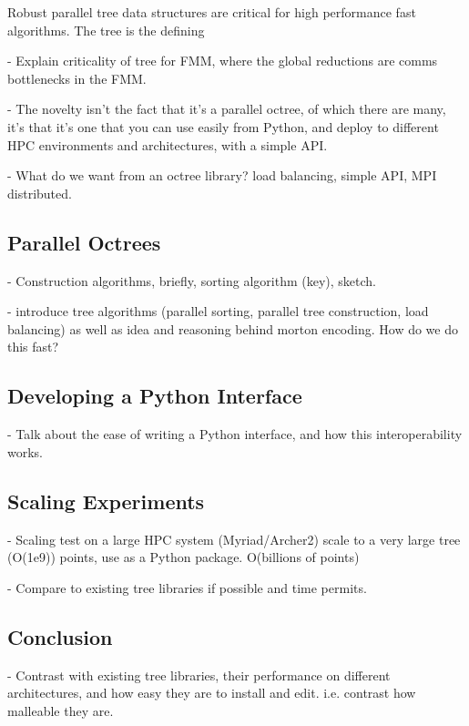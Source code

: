 Robust parallel tree data structures are critical for high performance fast algorithms. The tree is the defining 

- Explain criticality of tree for FMM, where the global reductions are comms bottlenecks in the FMM.

- The novelty isn't the fact that it's a parallel octree, of which there are many, it's that it's one that you can use easily from Python, and deploy to different HPC environments and architectures, with a simple API.

- What do we want from an octree library? load balancing, simple API, MPI distributed.

\subsection*{Parallel Octrees}

- Construction algorithms, briefly, sorting algorithm (key), sketch.

- introduce tree algorithms (parallel sorting, parallel tree construction, load balancing) as well as idea and reasoning behind morton encoding. How do we do this fast? 

\subsection*{Developing a Python Interface}
- Talk about the ease of writing a Python interface, and how this interoperability works.

\subsection*{Scaling Experiments}

- Scaling test on a large HPC system (Myriad/Archer2) scale to a very large tree (O(1e9)) points, use as a Python package.  O(billions of points)

- Compare to existing tree libraries if possible and time permits.

\subsection*{Conclusion}

- Contrast with existing tree libraries, their performance on different architectures, and how easy they are to install and edit. i.e. contrast how malleable they are.
